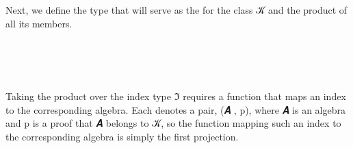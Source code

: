 Next, we define the type  that will serve as the  for the class \ab 𝒦 and the product of all its members.
\ccpad
\begin{code}%
\>[0]\AgdaSpace{}%
\AgdaSpace{}%
\AgdaSymbol{\{}\AgdaSpace{}%
\AgdaSymbol{:}\AgdaSpace{}%
\AgdaSymbol{\}}\AgdaSpace{}%
\AgdaSymbol{(}\AgdaSpace{}%
\AgdaSymbol{:}\AgdaSpace{}%
\AgdaSpace{}%
\AgdaSymbol{(}\AgdaSpace{}%
\AgdaSpace{}%
\AgdaSymbol{)(}\AgdaSpace{}%
\AgdaSymbol{))}\AgdaSpace{}%
\<%
\\
%
\\[\AgdaEmptyExtraSkip]%
\>[0][@{}l@{\AgdaIndent{0}}]%
\>[1]\AgdaSpace{}%
\AgdaSymbol{:}\AgdaSpace{}%
\AgdaSpace{}%
\AgdaSpace{}%
\<%
\\
%
\>[1]\AgdaSpace{}%
\AgdaSymbol{=}\AgdaSpace{}%
\AgdaSpace{}%
\AgdaSpace{}%
\AgdaSpace{}%
\AgdaSymbol{(}\AgdaSpace{}%
\AgdaSpace{}%
\AgdaSymbol{)}\AgdaSpace{}%
\AgdaFunction{,}\AgdaSpace{}%
\AgdaSymbol{(}\AgdaSpace{}%
\AgdaSpace{}%
\AgdaSymbol{)}\<%
\end{code}
\ccpad
Taking the product over the index type \af ℑ requires a function that maps an index  to the corresponding algebra.  Each  denotes a pair, (\ab 𝑨 , \ab p), where \ab 𝑨 is an algebra and \ab p is a proof that \ab 𝑨 belongs to \ab 𝒦, so the function mapping such an index to the corresponding algebra is simply the first projection.
\ccpad
\begin{code}
\>[0][@{}l@{\AgdaIndent{0}}]%
\>[1]\AgdaSpace{}%
\AgdaSymbol{:}\AgdaSpace{}%
\AgdaSpace{}%
\AgdaSpace{}%
\AgdaSpace{}%
\AgdaSpace{}%
\<%
\\
%
\>[1]\AgdaSpace{}%
\AgdaSymbol{=}\AgdaSpace{}%
\AgdaSpace{}%
\AgdaSymbol{(}\AgdaSpace{}%
\AgdaSymbol{:}\AgdaSpace{}%
\AgdaSymbol{)}\AgdaSpace{}%
\AgdaSpace{}%
\AgdaSpace{}%
\AgdaSpace{}%
\<%
\end{code}
